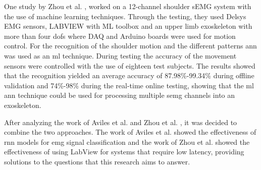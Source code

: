One study by Zhou et al. \cite{shoulderexo}, worked on a 12-channel shoulder sEMG system with the use of machine learning techniques. Through the testing, they used Delsys EMG sensors, LABVIEW with ML toolbox and an 
upper limb exoskeleton with more than four \acp{dof} where DAQ and Arduino boards were used for motion control. For the recognition of the shoulder motion and the different patterns \acrshort{ann} was used as an 
\acrshort{ml} technique. During testing the accuracy of the movement sensors were controlled with the use of eighteen test subjects. The results showed that the recognition yielded an average accuracy of 87.98\%-99.34\% 
during offline validation and 74\%-98\% during the real-time online testing, showing that the \acrshort{ml} \acrshort{ann} technique could be used for processing multiple \acrshort{semg} channels
into an exoskeleton.

After analyzing the work of Aviles et al. \cite{RNNEMG} and Zhou et al. \cite{shoulderexo}, it was decided to combine the two approaches. The work of Aviles et al. \cite{RNNEMG} showed the effectiveness of \acrshort{rnn} 
models for \acrshort{emg} signal classification and the work of Zhou et al. \cite{shoulderexo} showed the effectiveness of using LabView for systems that require low latency, providing solutions to the questions that
this research aims to answer.